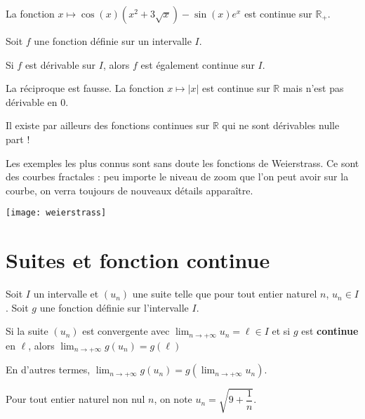 \documentclass[11pt,fleqn, openany]{book} %
\begin{document}
\begin{example} La fonction $x\mapsto \cos(x)(x^2+3\sqrt{x})-\sin(x)e^x$ est continue sur $\mathbb{R}_+$.\end{example}

\begin{theorem} Soit $f$ une fonction définie sur un intervalle $I$. 

Si $f$ est dérivable sur $I$, alors $f$ est également continue sur $I$.\end{theorem}

La réciproque est fausse. La fonction $x\mapsto |x|$ est continue sur $\mathbb{R}$ mais n'est pas dérivable en 0.

\begin{minipage}{0.6\linewidth}
Il existe par ailleurs des fonctions continues sur $\mathbb{R}$ qui ne sont dérivables nulle part ! 

Les exemples les plus connus sont sans doute les fonctions de Weierstrass. Ce sont des courbes fractales : peu importe le niveau de zoom que l'on peut avoir sur la courbe, on verra toujours de nouveaux détails apparaître.
\end{minipage}\hfill \begin{minipage}{0.35\linewidth}
\begin{center}
\texttt{[image: weierstrass]}
\end{center}
\end{minipage}



\section{Suites et fonction continue}

\begin{proposition} Soit $I$ un intervalle et $(u_n)$ une suite telle que pour tout entier naturel $n$, $u_n \in I$. Soit $g$ une fonction définie sur l'intervalle $I$. 

Si la suite $(u_n)$ est convergente avec $\displaystyle\lim_{n\to +\infty} u_n=\ell \in I$ et si $g$ est \textbf{continue} en $\ell$, alors $\displaystyle\lim_{n\to +\infty} g(u_n)=g(\ell)$

En d'autres termes, $\displaystyle\lim_{n\to +\infty}g(u_n)=g(\displaystyle\lim_{n\to +\infty} u_n)$.\end{proposition}

\begin{example} Pour tout entier naturel non nul $n$, on note $u_n=\sqrt{9+\dfrac{1}{n}}$.

\vskip50pt

\end{example}
\end{document}
